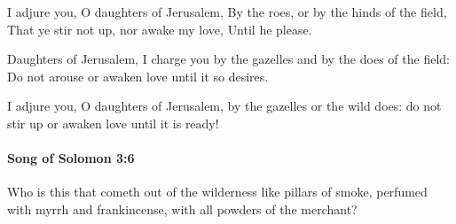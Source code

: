 			\begin{versebox}
					\item[BHS] 
					\item[LXX] 
					\item[ASV] I adjure you, O daughters of Jerusalem, By the roes, or by the hinds of the field, That ye stir not up, nor awake my love, Until he please.
					\item[NIV] Daughters of Jerusalem, I charge you by the gazelles and by the does of the field: Do not arouse or awaken love until it so desires.
					\item[NRSV] I adjure you, O daughters of Jerusalem, by the gazelles or the wild does: do not stir up or awaken love until it is ready!
			\end{versebox}

		\paragraph{Song of Solomon 3:6} %
			\label{SONGOFSOLOMON-3-6}

			Who is this that cometh out of the wilderness like pillars of smoke, perfumed with myrrh and frankincense, with all powders of the merchant?

